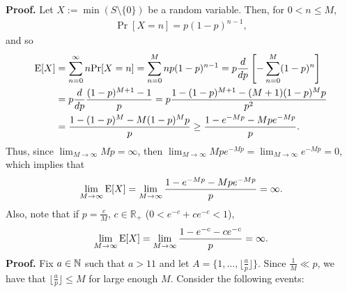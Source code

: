 \textbf{Proof. } Let $X := \min(S \setminus \{0\})$ be a random variable. Then, for $0 < n \leq M$,
\begin{align*}
    \Pr[X = n] = p(1 - p)^{n - 1}, 
\end{align*}
and so 
\begin{align*}
    \mathrm{E}[X] &= \sum_{n = 0}^{\infty} n\mathrm{Pr}[X = n] =
    \sum_{n = 0}^{M} np(1 - p)^{n - 1} = p\frac{d}{dp}\left[-\sum_{n = 0}^{M}(1 - p)^n\right]\\
    &=p\frac{d}{dp} \frac{(1 - p)^{M + 1} - 1}{p} = p\frac{1 - (1 - p)^{M + 1} - (M  + 1)(1 - p)^Mp}{p^2} \\
    &= \frac{1 - (1 - p)^{M} - M(1 - p)^Mp}{p} \geq \frac{1 - e^{-Mp} - Mpe^{-Mp}}{p}. \\
\end{align*}
Thus, since $\lim_{M \to \infty} Mp = \infty$, then $\lim_{M \to \infty }Mpe^{-Mp} = \lim_{M \to \infty} e^{-Mp} = 0$, which implies that
\[\lim _{M \to \infty} \mathrm{E}[X] = \lim_{M \to \infty} \frac{1 - e^{-Mp} - Mpe^{-Mp}}{p} = \infty.\]
Also, note that if $p = \frac{c}{M}$, $c \in \mathbb{R_+}$ ($0 < e^{-c} + ce^{-c} < 1$),
\[\lim _{M \to \infty} \mathrm{E}[X] = \lim_{M \to \infty} \frac{1 - e^{-c} - ce^{-c}}{p} = \infty.\]
\textbf{Proof. }
Fix $a \in \mathbb{N}$ such that $a > 11$ and let $A = \{1, \ldots, \lfloor\frac{a}{p}\rfloor\}$. Since   $\frac{1}{M} \ll p$, we have that $\lfloor\frac{a}{p}\rfloor \leq M$ for large enough $M$. Consider the following events:
